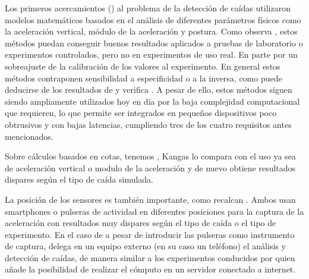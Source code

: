 \documentclass[../tfm.tex]{subfiles}
\begin{document}
Los primeros acercamientos (\cite{fallindex00, Kangas2008}) al problema de la detección de caídas utilizaron modelos matemáticos basados en el análisis de diferentes parámetros físicos como la aceleración vertical, módulo de la aceleración y postura. Como observa \cite{Bagala2012}, estos métodos puedan conseguir buenos resultados aplicados a pruebas de laboratorio o experimentos controlados, pero no en experimentos de uso real. En parte por un sobreajuste de la calibración de los valores al experimento. En general estos métodos contraponen sensibilidad a especificidad o a la inversa, como puede deducirse de los resultados de \cite{Chen2005,Bourke2006,Kangas2008,Vilarinho2015} y verifica \cite{Anita2020}. A pesar de ello, estos métodos siguen siendo ampliamente utilizados hoy en día por la baja complejidad computacional que requieren, lo que permite ser integrados en pequeños dispositivos poco obtrusivos y con bajas latencias, cumpliendo tres de los cuatro requisitos antes mencionados.


Sobre cálculos basados en cotas, tenemos \cite{fallindex00}, Kangas\cite{Kangas2008} lo compara con el uso ya sea de aceleración vertical o modulo de la aceleración y de nuevo obtiene resultados dispares según el tipo de caída simulada.

La posición de los sensores es también importante, como recalcan \cite{Bagala2012, Vilarinho2015}. Ambos usan smartphones o pulseras de actividad en diferentes posiciones para la captura de la aceleración con resultados muy dispares según el tipo de caída o el tipo de experimento. En el caso de \cite{Vilarinho2015} a pesar de introducir las pulseras como instrumento de captura, delega en un equipo externo (en su caso un teléfono) el análisis y detección de caídas, de manera similar a los experimentos conducidos por \cite{Luque2014} quien añade la posibilidad de realizar el cómputo en un servidor conectado a internet.

\end{document}
